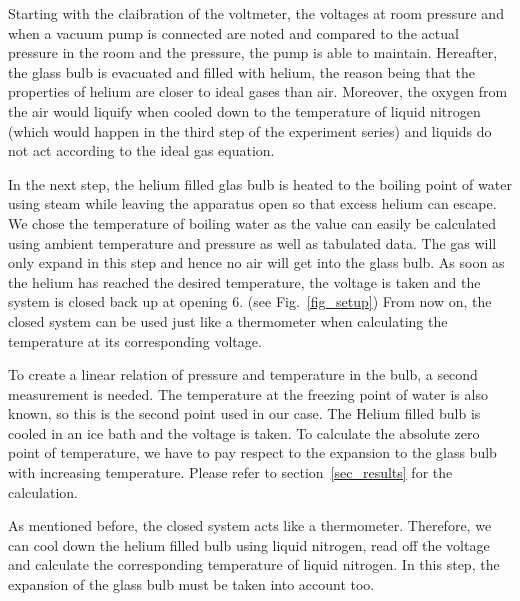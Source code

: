     Starting with the claibration of the voltmeter, the voltages at room pressure and when a vacuum pump is connected are noted and compared to the actual pressure in the room and the pressure, the pump is able to maintain.
    Hereafter, the glass bulb is evacuated and filled with helium, the reason being that the properties of helium are closer to ideal gases than air.
    Moreover, the oxygen from the air would liquify when cooled down to the temperature of liquid nitrogen (which would happen in the third step of the experiment series) and liquids do not act according to the ideal gas equation.

    In the next step, the helium filled glas bulb is heated to the boiling point of water using steam while leaving the apparatus open so that excess helium can escape.
    We chose the temperature of boiling water as the value can easily be calculated using ambient temperature and pressure as well as tabulated data.
    The gas will only expand in this step and hence no air will get into the glass bulb.
    As soon as the helium has reached the desired temperature, the voltage is taken and the system is closed back up at opening 6. (see Fig.~\ref{fig_setup})
    From now on, the closed system can be used just like a thermometer when calculating the temperature at its corresponding voltage.
    
    To create a linear relation of pressure and temperature in the bulb, a second measurement is needed.
    The temperature at the freezing point of water is also known, so this is the second point used in our case.
    The Helium filled bulb is cooled in an ice bath and the voltage is taken.
    To calculate the absolute zero point of temperature, we have to pay respect to the expansion to the glass bulb with increasing temperature.
    Please refer to section~\ref{sec_results} for the calculation.

    As mentioned before, the closed system acts like a thermometer.
    Therefore, we can cool down the helium filled bulb using liquid nitrogen, read off the voltage and calculate the corresponding temperature of liquid nitrogen.
    In this step, the expansion of the glass bulb must be taken into account too.
